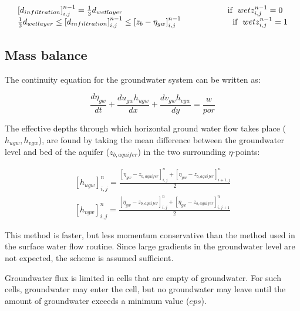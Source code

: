 \begin{equation} \label{2.91)} 
\begin{array}{l} {\left[d_{infiltration} \right]_{i,j}^{n-1} =\frac{1}{3} d_{wetlayer} {\rm \; \; \; \; \; \; \; \; \; \; \; \; \; \; \; \; \; \; \; \; \; \; \; \; \; \; \; \; \; \; \; \; \; \; \; \; \; \; \; \; \; \; \; \; \; \; if\; \; }wetz_{i,j}^{n-1} =0} \\ {\frac{1}{3} d_{wetlayer} \le \left[d_{infiltration} \right]_{i,j}^{n-1} \le \left[z_{b} -\eta _{gw} \right]_{i,j}^{n-1} {\rm \; \; \; \; \; \; \; \; \; \; \; \; \; \; \; \; \; \; \; \; \; \; if\; \; }wetz_{i,j}^{n-1} =1} \end{array} 
\end{equation} 

\subsection{ Mass balance}

The continuity equation for the groundwater system can be written as:

\begin{equation} \label{2.92)} 
\frac{d\eta _{gw} }{dt} +\frac{du_{gw} h_{ugw} }{dx} +\frac{dv_{gw} h_{vgw} }{dy} =\frac{w}{por}  
\end{equation} 

The effective depths through which horizontal ground water flow takes place ($h_{ugw} ,h_{vgw} $), are found by taking the mean difference between the groundwater level and bed of the aquifer ($z_{b,aquifer} $) in the two surrounding $\eta $-points:

\begin{equation} \label{2.93)} 
\begin{array}{l} {\left[h_{ugw} \right]_{i,j}^{n} =\frac{\left[\eta _{gw} -z_{b,aquifer} \right]_{i,j}^{n} +\left[\eta _{gw} -z_{b,aquifer} \right]_{i+1,j}^{n} }{2} } \\ {\left[h_{vgw} \right]_{i,j}^{n} =\frac{\left[\eta _{gw} -z_{b,aquifer} \right]_{i,j}^{n} +\left[\eta _{gw} -z_{b,aquifer} \right]_{i,j+1}^{n} }{2} } \end{array} 
\end{equation} 

This method is faster, but less momentum conservative than the method used in the surface water flow routine. Since large gradients in the groundwater level are not expected, the scheme is assumed sufficient.

Groundwater flux is limited in cells that are empty of groundwater. For such cells, groundwater may enter the cell, but no groundwater may leave until the amount of groundwater exceeds a minimum value ($eps$).

